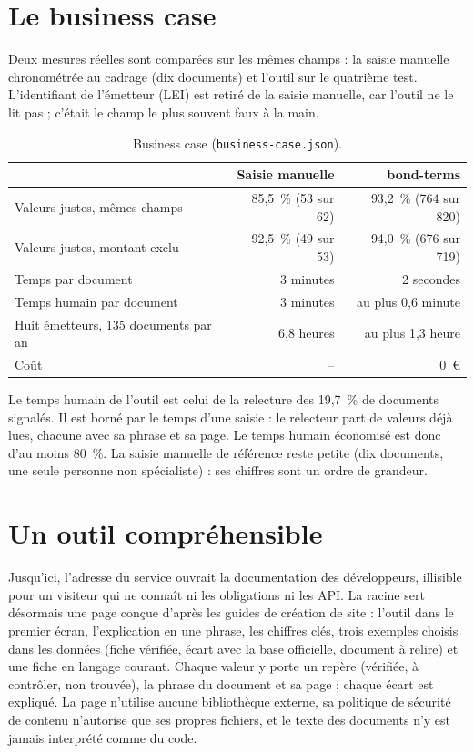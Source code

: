 \documentclass[11pt,a4paper]{article}
\begin{document}
\section{Le business case}

Deux mesures réelles sont comparées sur les mêmes champs : la saisie manuelle chronométrée au cadrage (dix documents) et l'outil sur le quatrième test. L'identifiant de l'émetteur (LEI) est retiré de la saisie manuelle, car l'outil ne le lit pas ; c'était le champ le plus souvent faux à la main.

\begin{table}[H]
\small
\begin{tabularx}{\linewidth}{Yrr}
\toprule
& \textbf{Saisie manuelle} & \textbf{bond-terms} \\
\midrule
Valeurs justes, mêmes champs & 85,5~\% (53 sur 62) & 93,2~\% (764 sur 820) \\
Valeurs justes, montant exclu & 92,5~\% (49 sur 53) & 94,0~\% (676 sur 719) \\
Temps par document & 3 minutes & 2 secondes \\
Temps humain par document & 3 minutes & au plus 0,6 minute \\
Huit émetteurs, 135 documents par an & 6,8 heures & au plus 1,3 heure \\
Coût & -- & 0~€ \\
\bottomrule
\end{tabularx}
\caption{Business case (\texttt{business-case.json}).}
\end{table}

Le temps humain de l'outil est celui de la relecture des 19,7~\% de documents signalés. Il est borné par le temps d'une saisie : le relecteur part de valeurs déjà lues, chacune avec sa phrase et sa page. Le temps humain économisé est donc d'au moins 80~\%. La saisie manuelle de référence reste petite (dix documents, une seule personne non spécialiste) : ses chiffres sont un ordre de grandeur.

\section{Un outil compréhensible}

Jusqu'ici, l'adresse du service ouvrait la documentation des développeurs, illisible pour un visiteur qui ne connaît ni les obligations ni les API. La racine sert désormais une page conçue d'après les guides de création de site : l'outil dans le premier écran, l'explication en une phrase, les chiffres clés, trois exemples choisis dans les données (fiche vérifiée, écart avec la base officielle, document à relire) et une fiche en langage courant. Chaque valeur y porte un repère (vérifiée, à contrôler, non trouvée), la phrase du document et sa page ; chaque écart est expliqué. La page n'utilise aucune bibliothèque externe, sa politique de sécurité de contenu n'autorise que ses propres fichiers, et le texte des documents n'y est jamais interprété comme du code.
\end{document}
